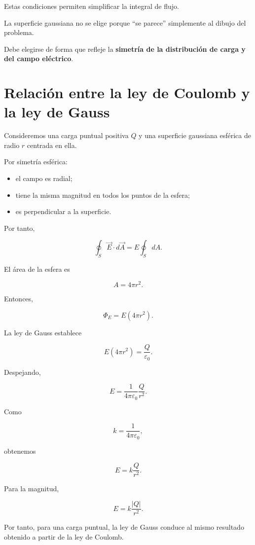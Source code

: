 Estas condiciones permiten simplificar la integral de flujo.


\begin{advertencia}

La superficie gaussiana no se elige porque ``se parece'' simplemente al dibujo del
problema.

Debe elegirse de forma que refleje la \textbf{simetría de la distribución de carga y
del campo eléctrico}.

\end{advertencia}


\section{Relación entre la ley de Coulomb y la ley de Gauss}

Consideremos una carga puntual positiva \(Q\) y una superficie gaussiana esférica
de radio \(r\) centrada en ella.

Por simetría esférica:

\begin{itemize}
    \item el campo es radial;
    \item tiene la misma magnitud en todos los puntos de la esfera;
    \item es perpendicular a la superficie.
\end{itemize}

Por tanto,

\[
\oint_S\vec E\cdot d\vec A
=
E\oint_SdA.
\]

El área de la esfera es

\[
A=4\pi r^2.
\]

Entonces,

\[
\Phi_E=E(4\pi r^2).
\]

La ley de Gauss establece

\[
E(4\pi r^2)=\frac{Q}{\varepsilon_0}.
\]

Despejando,

\[
E=\frac{1}{4\pi\varepsilon_0}\frac{Q}{r^2}.
\]

Como

\[
k=\frac{1}{4\pi\varepsilon_0},
\]

obtenemos

\[
\boxed{E=k\frac{Q}{r^2}}.
\]

Para la magnitud,

\[
\boxed{E=k\frac{|Q|}{r^2}}.
\]

Por tanto, para una carga puntual, la ley de Gauss conduce al mismo resultado obtenido
a partir de la ley de Coulomb.


